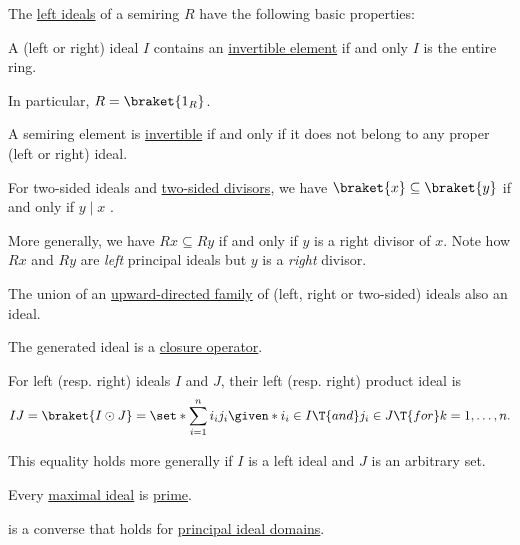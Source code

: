\begin{proposition}\label{thm:def:semiring_ideal}
  The \hyperref[def:semiring_ideal]{left ideals} of a semiring \( R \) have the following basic properties:
  \begin{thmenum}
     A (left or right) ideal \( I \) contains an \hyperref[def:semiring_divisibility/invertible]{invertible element} if and only \( I \) is the entire ring.

    In particular, \( R = \braket{ 1_R } \).

     A semiring element is \hyperref[def:semiring_divisibility/invertible]{invertible} if and only if it does not belong to any proper (left or right) ideal.

     For two-sided ideals and \hyperref[def:semiring_divisibility]{two-sided divisors}, we have \( \braket{ x } \subseteq \braket{ y } \) if and only if \( y \mid x \) .

    More generally, we have \( Rx \subseteq Ry \) if and only if \( y \) is a right divisor of \( x \). Note how \( Rx \) and \( Ry \) are \emph{left} principal ideals but \( y \) is a \emph{right} divisor.

     The union of an \hyperref[def:directed_set]{upward-directed family} of (left, right or two-sided) ideals also an ideal.

     The generated ideal is a \hyperref[def:abstract_closure_operator]{closure operator}.

     For left (resp. right) ideals \( I \) and \( J \), their left (resp. right) product ideal is
    \begin{equation}\label{eq:thm:def:semiring_ideal/product}
      IJ = \braket{ I \odot J } = \set*{ \sum_{i=1}^n i_i j_i \given* i_i \in I \T{and} j_i \in J \T{for} k = 1, \ldots, n }.
    \end{equation}

    This equality holds more generally if \( I \) is a left ideal and \( J \) is an arbitrary set.

     Every \hyperref[def:semiring_ideal/maximal]{maximal ideal} is \hyperref[def:semiring_ideal/prime]{prime}.

     is a converse that holds for \hyperref[def:principal_ideal_domain]{principal ideal domains}.


\end{thmenum}
\end{proposition}
